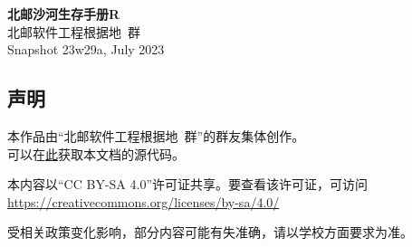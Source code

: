 \documentclass[a4paper]{article}
\begin{document}


\begin{titlepage}
    \centering
    {\Huge\rmfamily\bfseries 北邮沙河生存手册R} \\[6.5ex]
    {\Large\sffamily 北邮软件工程根据地\ 群} \\
    {\large\ttfamily Snapshot 23w29a, July 2023}\\[1.5ex]
\end{titlepage}

\newpage
\begin{center}
\section*{声明}

本作品由“北邮软件工程根据地\ 群”的群友集体创作。\\
可以在\href{https://github.com/BUPTSE/welcome}{此}获取本文档的源代码。

\smallskip

本内容以“CC BY-SA 4.0”许可证共享。要查看该许可证，可访问\\
\href{https://creativecommons.org/licenses/by-sa/4.0/}{https://creativecommons.org/licenses/by-sa/4.0/}

\smallskip

受相关政策变化影响，部分内容可能有失准确，请以学校方面要求为准。

\bigskip

\end{center}

\newpage
\setcounter{page}{1}
\tableofcontents

\newpage
\setcounter{page}{1}

\pagestyle{fancy}
\lhead{\small \leftmark}
\chead{}
\lfoot{}
\cfoot{\thepage}
\rfoot{}
\renewcommand{\headrulewidth}{0.4pt}




















\end{document}
